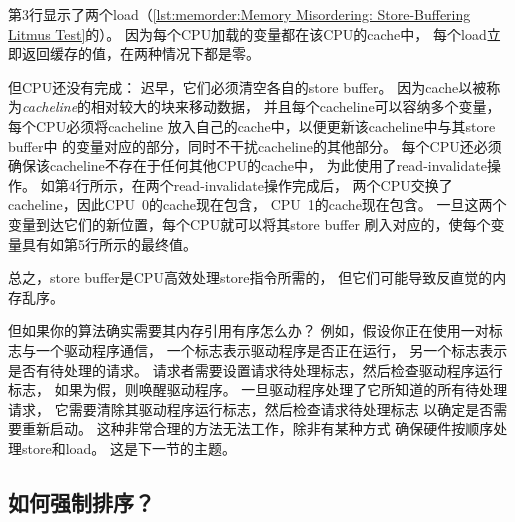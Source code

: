 \QuickQuizEnd

\begin{fcvref}
第3行显示了两个load（\cref{lst:memorder:Memory Misordering: Store-Buffering Litmus Test}的）。
因为每个CPU加载的变量都在该CPU的cache中，
每个load立即返回缓存的值，在两种情况下都是零。
\end{fcvref}

但CPU还没有完成：
迟早，它们必须清空各自的store buffer。
因为cache以被称为\emph{cacheline}的相对较大的块来移动数据，
并且每个cacheline可以容纳多个变量，每个CPU必须将cacheline
放入自己的cache中，以便更新该cacheline中与其store buffer中
的变量对应的部分，同时不干扰cacheline的其他部分。
每个CPU还必须确保该cacheline不存在于任何其他CPU的cache中，
为此使用了read-invalidate操作。
如第4行所示，在两个read-invalidate操作完成后，
两个CPU交换了cacheline，因此CPU~0的cache现在包含，
CPU~1的cache现在包含。
一旦这两个变量到达它们的新位置，每个CPU就可以将其store buffer
刷入对应的，使每个变量具有如第5行所示的最终值。

\QuickQuizEnd

总之，store buffer是CPU高效处理store指令所需的，
但它们可能导致反直觉的内存乱序。

但如果你的算法确实需要其内存引用有序怎么办？
例如，假设你正在使用一对标志与一个驱动程序通信，
一个标志表示驱动程序是否正在运行，
另一个标志表示是否有待处理的请求。
请求者需要设置请求待处理标志，然后检查驱动程序运行标志，
如果为假，则唤醒驱动程序。
一旦驱动程序处理了它所知道的所有待处理请求，
它需要清除其驱动程序运行标志，然后检查请求待处理标志
以确定是否需要重新启动。
这种非常合理的方法无法工作，除非有某种方式
确保硬件按顺序处理store和load。
这是下一节的主题。

\subsection{如何强制排序？}
\label{sec:memorder:How to Force Ordering?}

